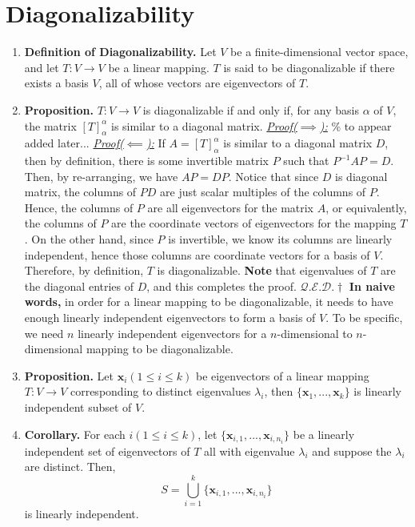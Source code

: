 \documentclass[oneside, 12pt]{book}
\newcommand{\settag}[1]{\renewcommand{\theenumi}{#1}}
\newcommand{\qed}{\hfill $\mathcal{Q}.\mathcal{E}.\mathcal{D}.\dagger$}
\newcommand{\tbf}[1]{\textbf{#1}}
\newcommand{\tit}[1]{\textit{#1}}
\newcommand{\proofforward}{\tit{\underline{Proof($\implies$):}}}
\newcommand{\proofback}{\tit{\underline{Proof($\impliedby$):}}}
\newcommand{\trans}[3]{$#1:#2\rightarrow{}#3$}
\newcommand{\map}[3]{\text{$\left[#1\right]_{#2}^{#3}$}}
\newcommand{\para}[1]{\item \tbf{#1}}
\newcommand{\vx}{\mathbf{x}}
\begin{document}
\section{Diagonalizability}
\begin{enumerate}
    \settag{4.2.1}
    \para{Definition of Diagonalizability.} Let $V$ be a finite-dimensional vector space, and let \trans{T}{V}{V} be a linear mapping. $T$ is said to be diagonalizable if there exists a basis $V$, all of whose vectors are eigenvectors of $T$.
    
    \settag{4.2.2}
    \para{Proposition.} \trans{T}{V}{V} is diagonalizable if and only if, for any basis $\alpha$ of $V$, the matrix $\map{T}{\alpha}{\alpha}$ is similar to a diagonal matrix. \newline
    \proofforward \newline
    \% to appear added later... \newline
    \proofback \newline
    If $A = \map{T}{\alpha}{\alpha}$ is similar to a diagonal matrix $D$, then by definition, there is some invertible matrix $P$ such that $P^{-1}AP = D$. Then, by re-arranging, we have $AP = DP$. Notice that since $D$ is diagonal matrix, the columns of $PD$ are just scalar multiples of the columns of $P$. Hence, the columns of $P$ are all eigenvectors for the matrix $A$, or equivalently, the columns of $P$ are the coordinate vectors of eigenvectors for the mapping $T$. On the other hand, since $P$ is invertible, we know its columns are linearly independent, hence those columns are coordinate vectors for a basis of $V$. Therefore, by definition, $T$ is diagonalizable. \tbf{Note} that eigenvalues of $T$ are the diagonal entries of $D$, and this completes the proof. \qed\newline
    \tbf{In naive words, }in order for a linear mapping to be diagonalizable, it needs to have enough linearly independent eigenvectors to form a basis of $V$. To be specific, we need $n$ linearly independent eigenvectors for a $n$-dimensional to $n$-dimensional mapping to be diagonalizable.
    
    \settag{4.2.4}
    \para{Proposition.} Let $\vx_i(1 \leq i \leq k)$ be eigenvectors of a linear mapping \trans{T}{V}{V} corresponding to distinct eigenvalues $\lambda_i$, then $\{\vx_1,...,\vx_k\}$ is linearly independent subset of $V$.
    
    \settag{4.2.5}
    \para{Corollary.} For each $i(1 \leq i \leq k)$, let $\{\vx_{i, 1},...,\vx_{i, n_i}\}$ be a linearly independent set of eigenvectors of $T$ all with eigenvalue $\lambda_i$ and suppose the $\lambda_i$ are distinct. Then, 
    \begin{equation*}
        S=\bigcup_{i=1}^k\{\vx_{i, 1},...,\vx_{i, n_i}\}
    \end{equation*}
    is linearly independent.
    

\end{enumerate}
\end{document}
